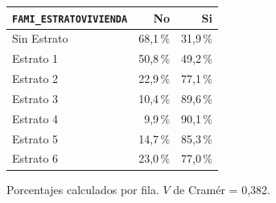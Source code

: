 \begingroup\scriptsize{}
\par\medskip
\noindent\begin{minipage}{\textwidth}
\centering
{}\label{tab:conting-1}
\begin{tabular}{P{5.2cm} r r}
  \toprule
  \textbf{\texttt{FAMI\_ESTRATOVIVIENDA}} & \textbf{No} & \textbf{Si} \\
  \midrule

  Sin Estrato & 68,1\,\% & 31,9\,\% \\
  Estrato 1 & 50,8\,\% & 49,2\,\% \\
  Estrato 2 & 22,9\,\% & 77,1\,\% \\
  Estrato 3 & 10,4\,\% & 89,6\,\% \\
  Estrato 4 & 9,9\,\% & 90,1\,\% \\
  Estrato 5 & 14,7\,\% & 85,3\,\% \\
  Estrato 6 & 23,0\,\% & 77,0\,\% \\
  \bottomrule
\end{tabular}
\par\vspace{0.4em}\raggedright{\footnotesize Porcentajes calculados por fila. $V$ de Cramér = 0,382.\par}
\end{minipage}
\par\medskip
\endgroup

